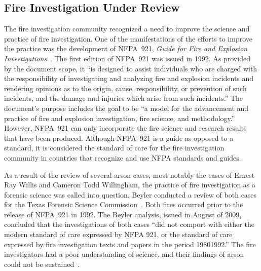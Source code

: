 \documentclass[twoside]{uocthesis}
\begin{document}
\subsection{Fire Investigation Under Review}
The fire investigation community recognized a need to improve the science and practice of fire investigation.  One of the manifestations of the efforts to improve the practice was the development of NFPA~921, {\em Guide for Fire and Explosion Investigations}~\cite{NFPA:921}.  The first edition of NFPA~921 was issued in 1992.  As provided by the document scope, it ``is designed to assist individuals who are charged with the responsibility of investigating and analyzing fire and explosion incidents and rendering opinions as to the origin, cause, responsibility, or prevention of such incidents, and the damage and injuries which arise from such incidents.'' The document’s purpose includes the goal to be ``a model for the advancement and practice of fire and explosion investigation, fire science, and methodology.'' However, NFPA~921 can only incorporate the fire science and research results that have been produced.  Although NFPA~921 is a guide as opposed to a standard, it is considered the standard of care for the fire investigation community in countries that recognize and use NFPA standards and guides.

As a result of the review of several arson cases, most notably the cases of Ernest Ray Willis and Cameron Todd Willingham, the practice of fire investigation as a forensic science was called into question.  Beyler conducted a review of both cases for the Texas Forensic Science Commission~\cite{Beyler:2009}.  Both fires occurred prior to the release of NFPA~921 in 1992.  The Beyler analysis, issued in August of 2009, concluded that the investigations of both cases ``did not comport with either the modern standard of care expressed by NFPA 921, or the standard of care expressed by fire investigation texts and papers in the period 1980{\textendash}1992.'' The fire investigators had a poor understanding of science, and their findings of arson could not be sustained~\cite{Beyler:2009}.
\end{document}
